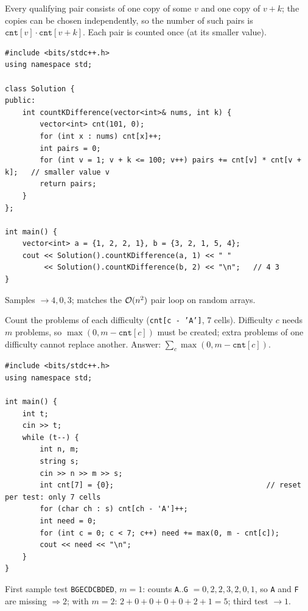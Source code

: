 \begin{solutionbox}
Every qualifying pair consists of one copy of some $v$ and one copy of $v + k$; the copies can be chosen independently, so the number of such pairs is $\texttt{cnt}[v] \cdot \texttt{cnt}[v+k]$. Each pair is counted once (at its smaller value).
\begin{lstlisting}[style=cpp]
#include <bits/stdc++.h>
using namespace std;

class Solution {
public:
    int countKDifference(vector<int>& nums, int k) {
        vector<int> cnt(101, 0);
        for (int x : nums) cnt[x]++;
        int pairs = 0;
        for (int v = 1; v + k <= 100; v++) pairs += cnt[v] * cnt[v + k];   // smaller value v
        return pairs;
    }
};

int main() {
    vector<int> a = {1, 2, 2, 1}, b = {3, 2, 1, 5, 4};
    cout << Solution().countKDifference(a, 1) << " "
         << Solution().countKDifference(b, 2) << "\n";   // 4 3
}
\end{lstlisting}
\begin{center}
\end{center}
Samples $\to 4, 0, 3$; matches the $\mathcal{O}(n^2)$ pair loop on random arrays.
\end{solutionbox}

\begin{solutionbox}
Count the problems of each difficulty (\texttt{cnt[c - 'A']}, 7 cells). Difficulty $c$ needs $m$ problems, so $\max(0, m - \texttt{cnt}[c])$ must be created; extra problems of one difficulty cannot replace another. Answer: $\sum_c \max(0, m - \texttt{cnt}[c])$.
\begin{lstlisting}[style=cpp]
#include <bits/stdc++.h>
using namespace std;

int main() {
    int t;
    cin >> t;
    while (t--) {
        int n, m;
        string s;
        cin >> n >> m >> s;
        int cnt[7] = {0};                                   // reset per test: only 7 cells
        for (char ch : s) cnt[ch - 'A']++;
        int need = 0;
        for (int c = 0; c < 7; c++) need += max(0, m - cnt[c]);
        cout << need << "\n";
    }
}
\end{lstlisting}
First sample test \texttt{BGECDCBDED}, $m = 1$: counts \texttt{A}..\texttt{G} $= 0, 2, 2, 3, 2, 0, 1$, so \texttt{A} and \texttt{F} are missing $\Rightarrow 2$; with $m = 2$: $2 + 0 + 0 + 0 + 0 + 2 + 1 = 5$; third test $\to 1$.
\end{solutionbox}

